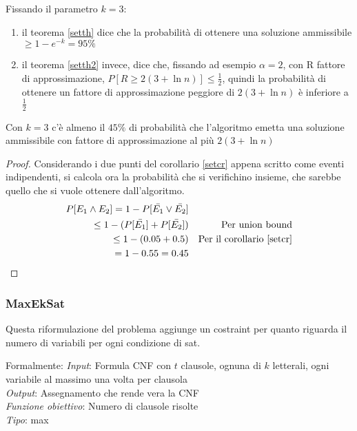 \begin{corollary}
    \label{setcr}
    Fissando il parametro $k = 3$:
    \begin{enumerate}
        \item il teorema \ref{setth} dice che la probabilità di ottenere una soluzione ammissibile
        $\geq 1-e^{-k} = 95\%$
        \item il teorema \ref{setth2} invece, dice che, fissando ad esempio $\alpha=2$, con R fattore di 
        approssimazione,  $P[R \geq 2(3 + \ln n)] \leq \frac{1}{2}$, quindi la probabilità di ottenere un fattore
        di approssimazione peggiore di $2(3 + \ln n)$ è inferiore a $\frac{1}{2}$
    \end{enumerate}
\end{corollary}

\begin{corollary}
    Con $k = 3$ c'è almeno il $45\%$ di probabilità che l'algoritmo emetta una 
    soluzione ammissibile con fattore di approssimazione al più $2(3+\ln n)$
\end{corollary}
\begin{proof}
    Considerando i due punti del corollario \ref{setcr} appena scritto come eventi indipendenti, 
    si calcola ora la probabilità che si verifichino insieme, che sarebbe quello che si vuole 
    ottenere dall'algoritmo.
    \begin{equation}
        \begin{aligned}
            P[E_1 \wedge E_2] = 1 - P[\bar{E_1} \lor \bar{E_2}]\\
            \leq 1 - (P[\bar{E_1}] + P[\bar{E_2}]) && \text{Per union bound}\\
            \leq 1 - (0.05 + 0.5) && \text{Per il corollario \ref{setcr}}\\
            = 1 - 0.55 = 0.45
        \end{aligned}
    \end{equation}    
\end{proof}

\subsubsection{MaxEkSat}
\label{eksat}
Questa riformulazione del problema aggiunge un costraint per quanto riguarda il numero di 
variabili per ogni condizione di sat.

Formalmente:
\emph{Input}: Formula CNF con $t$ clausole, ognuna di $k$ letterali, ogni variabile al massimo una volta
per clausola\\
\emph{Output}: Assegnamento che rende vera la CNF\\
\emph{Funzione obiettivo}: Numero di clausole risolte\\
\emph{Tipo}: max


